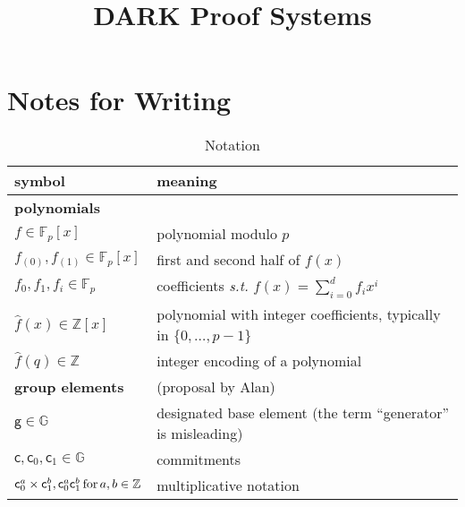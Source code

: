 \documentclass{article}
\begin{document}
\title{DARK Proof Systems}
\maketitle

\section*{Notes for Writing}
\begin{table}
    \caption{Notation}
    \label{tab:notation}
    \centering
    \begin{tabular}{l|l}
        symbol & meaning   \\ \hline \hline
        {\bf polynomials} & \\ \hline
        $f \in \mathbb{F}_p[x]$ & polynomial modulo $p$ \\
        $f_{(0)}, f_{(1)} \in \mathbb{F}_p[x]$ & first and second half of $f(x)$ \\
        $f_0, f_1, f_i \in \mathbb{F}_p$ & coefficients \emph{s.t.} $f(x) = \sum_{i=0}^d f_ix^i$ \\
        $\hat{f}(x) \in \mathbb{Z}[x]$ & polynomial with integer coefficients, typically in $\{0,\ldots,p-1\}$ \\ 
        $\hat{f}(q) \in \mathbb{Z}$ & integer encoding of a polynomial \\ \hline
        {\bf group elements} & (proposal by Alan) \\ \hline
        $\mathsf{g} \in \mathbb{G}$ & designated base element (the term ``generator'' is misleading) \\
        $\mathsf{c}, \mathsf{c}_0, \mathsf{c}_1 \in \mathbb{G}$ & commitments \\
        $\mathsf{c}_0^a \times \mathsf{c}_1^b, \mathsf{c}_0^a\mathsf{c}_1^b \, \textnormal{for} \, a, b \in \mathbb{Z}$ & multiplicative notation \\ \hline
    \end{tabular}
\end{table}
\end{document}
